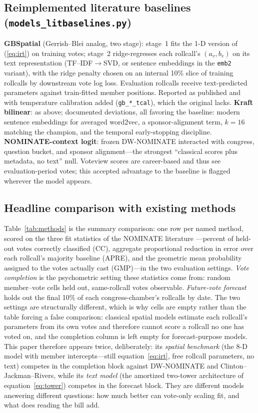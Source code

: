 \documentclass[11pt]{article}
\newcommand{\code}[1]{\texttt{#1}}
\begin{document}
\subsection{Reimplemented literature baselines
(\code{models\_litbaselines.py})}
\label{sec:litreimpl}

\textbf{GBSpatial} (Gerrish--Blei analog, two stage): stage~1 fits the
1-D version of (\ref{eq:irt}) on training votes; stage~2 ridge-regresses
each rollcall's $(a_v, b_v)$ on its text representation
(TF--IDF$\to$SVD, or sentence embeddings in the \code{emb2} variant),
with the ridge penalty chosen on an internal 10\% slice of training
rollcalls by downstream vote log loss. Evaluation rollcalls receive
text-predicted parameters against train-fitted member positions.
Reported as published and with temperature calibration added
(\code{gb\_*\_tcal}), which the original lacks. \textbf{Kraft bilinear}:
as above; documented deviations, all favoring the baseline: modern
sentence embeddings for averaged word2vec, a sponsor-alignment term,
$k = 16$ matching the champion, and the temporal early-stopping
discipline. \textbf{NOMINATE-context logit}: frozen DW-NOMINATE
interacted with congress, question bucket, and sponsor
alignment---the strongest ``classical scores plus metadata, no text''
null. Voteview scores are career-based and thus see evaluation-period
votes; this accepted advantage to the baseline is flagged wherever the
model appears.

\subsection{Headline comparison with existing methods}
\label{sec:headline}

Table~\ref{tab:methods} is the summary comparison: one row per named
method, scored on the three fit statistics of the NOMINATE literature
---percent of held-out votes correctly classified (CC), aggregate
proportional reduction in error over each rollcall's majority baseline
(APRE), and the geometric mean probability assigned to the votes
actually cast (GMP)---in the two evaluation settings. \emph{Vote
completion} is the psychometric setting these statistics come from:
random member--vote cells held out, same-rollcall votes observable.
\emph{Future-vote forecast} holds out the final 10\% of each
congress-chamber's rollcalls by date. The two settings are structurally
different, which is why cells are empty rather than the table forcing a
false comparison: classical spatial models estimate each rollcall's
parameters from its own votes and therefore cannot score a rollcall no
one has voted on, and the completion column is left empty for
forecast-purpose models. This paper therefore appears twice,
deliberately: its \emph{spatial benchmark} (the 8-D model with member
intercepts---still equation~\ref{eq:irt}, free rollcall parameters, no
text) competes in the completion block against DW-NOMINATE and
Clinton--Jackman--Rivers, while its \emph{text model} (the amortized
two-tower architecture of equation~\ref{eq:tower}) competes in the
forecast block. They are different models answering different
questions: how much better can vote-only scaling fit, and what does
reading the bill add.
\end{document}
